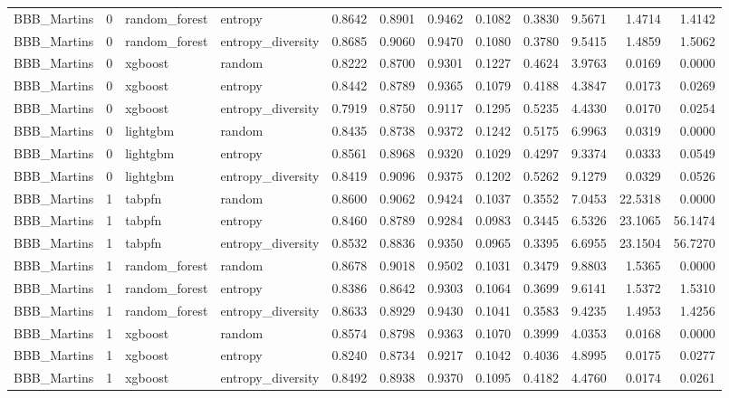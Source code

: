 \begin{tabular}{lrllrrrrrrrr}
BBB_Martins & 0 & random_forest & entropy & 0.8642 & 0.8901 & 0.9462 & 0.1082 & 0.3830 & 9.5671 & 1.4714 & 1.4142 \\
BBB_Martins & 0 & random_forest & entropy_diversity & 0.8685 & 0.9060 & 0.9470 & 0.1080 & 0.3780 & 9.5415 & 1.4859 & 1.5062 \\
BBB_Martins & 0 & xgboost & random & 0.8222 & 0.8700 & 0.9301 & 0.1227 & 0.4624 & 3.9763 & 0.0169 & 0.0000 \\
BBB_Martins & 0 & xgboost & entropy & 0.8442 & 0.8789 & 0.9365 & 0.1079 & 0.4188 & 4.3847 & 0.0173 & 0.0269 \\
BBB_Martins & 0 & xgboost & entropy_diversity & 0.7919 & 0.8750 & 0.9117 & 0.1295 & 0.5235 & 4.4330 & 0.0170 & 0.0254 \\
BBB_Martins & 0 & lightgbm & random & 0.8435 & 0.8738 & 0.9372 & 0.1242 & 0.5175 & 6.9963 & 0.0319 & 0.0000 \\
BBB_Martins & 0 & lightgbm & entropy & 0.8561 & 0.8968 & 0.9320 & 0.1029 & 0.4297 & 9.3374 & 0.0333 & 0.0549 \\
BBB_Martins & 0 & lightgbm & entropy_diversity & 0.8419 & 0.9096 & 0.9375 & 0.1202 & 0.5262 & 9.1279 & 0.0329 & 0.0526 \\
BBB_Martins & 1 & tabpfn & random & 0.8600 & 0.9062 & 0.9424 & 0.1037 & 0.3552 & 7.0453 & 22.5318 & 0.0000 \\
BBB_Martins & 1 & tabpfn & entropy & 0.8460 & 0.8789 & 0.9284 & 0.0983 & 0.3445 & 6.5326 & 23.1065 & 56.1474 \\
BBB_Martins & 1 & tabpfn & entropy_diversity & 0.8532 & 0.8836 & 0.9350 & 0.0965 & 0.3395 & 6.6955 & 23.1504 & 56.7270 \\
BBB_Martins & 1 & random_forest & random & 0.8678 & 0.9018 & 0.9502 & 0.1031 & 0.3479 & 9.8803 & 1.5365 & 0.0000 \\
BBB_Martins & 1 & random_forest & entropy & 0.8386 & 0.8642 & 0.9303 & 0.1064 & 0.3699 & 9.6141 & 1.5372 & 1.5310 \\
BBB_Martins & 1 & random_forest & entropy_diversity & 0.8633 & 0.8929 & 0.9430 & 0.1041 & 0.3583 & 9.4235 & 1.4953 & 1.4256 \\
BBB_Martins & 1 & xgboost & random & 0.8574 & 0.8798 & 0.9363 & 0.1070 & 0.3999 & 4.0353 & 0.0168 & 0.0000 \\
BBB_Martins & 1 & xgboost & entropy & 0.8240 & 0.8734 & 0.9217 & 0.1042 & 0.4036 & 4.8995 & 0.0175 & 0.0277 \\
BBB_Martins & 1 & xgboost & entropy_diversity & 0.8492 & 0.8938 & 0.9370 & 0.1095 & 0.4182 & 4.4760 & 0.0174 & 0.0261 \\

\end{tabular}
